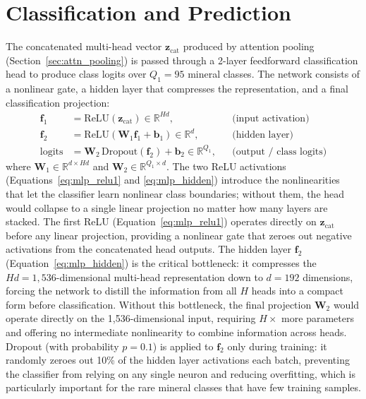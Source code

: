 \documentclass[11pt]{report}
\newcommand{\R}{\mathbb{R}}
\begin{document}
\section{Classification and Prediction}
\label{sec:classification}

The concatenated multi-head vector $\mathbf{z}_{\text{cat}}$ produced by attention pooling (Section~\ref{sec:attn_pooling}) is passed through a 2-layer feedforward classification head to produce class logits over $Q_1 = 95$ mineral classes. 
The network consists of a nonlinear gate, a hidden layer that compresses the representation, and a final classification projection:
\begin{align}
\mathbf{f}_1 &= \text{ReLU}(\mathbf{z}_{\text{cat}}) \in \R^{Hd}, & & \text{(input activation)} \label{eq:mlp_relu1} \\
\mathbf{f}_2 &= \text{ReLU}(\mathbf{W}_1 \mathbf{f}_1 + \mathbf{b}_1) \in \R^{d}, & & \text{(hidden layer)} \label{eq:mlp_hidden} \\
\text{logits} &= \mathbf{W}_2 \, \text{Dropout}(\mathbf{f}_2) + \mathbf{b}_2 \in \R^{Q_1}, & & \text{(output / class logits)} \label{eq:mlp_logits}
\end{align}
where $\mathbf{W}_1 \in \R^{d \times Hd}$ and $\mathbf{W}_2 \in \R^{Q_1 \times d}$. 
The two ReLU activations (Equations~\ref{eq:mlp_relu1} and \ref{eq:mlp_hidden}) introduce the nonlinearities that let the classifier learn nonlinear class boundaries; without them, the head would collapse to a single linear projection no matter how many layers are stacked. The first ReLU (Equation~\ref{eq:mlp_relu1}) operates directly on $\mathbf{z}_{\text{cat}}$ before any linear projection, providing a nonlinear gate that zeroes out negative activations from the concatenated head outputs. 
The hidden layer $\mathbf{f}_2$ (Equation~\ref{eq:mlp_hidden}) is the critical bottleneck: it compresses the $Hd = 1{,}536$-dimensional multi-head representation down to $d = 192$ dimensions, forcing the network to distill the information from all $H$ heads into a compact form before classification. 
Without this bottleneck, the final projection $\mathbf{W}_2$ would operate directly on the 1{,}536-dimensional input, requiring $H\times$ more parameters and offering no intermediate nonlinearity to combine information across heads. Dropout (with probability $p = 0.1$) is applied to $\mathbf{f}_2$ only during training: it randomly zeroes out 10\% of the hidden layer activations each batch, preventing the classifier from relying on any single neuron and reducing overfitting, which is particularly important for the rare mineral classes that have few training samples.
\end{document}
